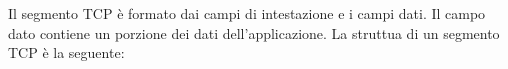 \documentclass{book}
\begin{document}
Il segmento TCP {\`e} formato dai campi di intestazione e i campi dati. Il
campo dato contiene un porzione dei dati dell'applicazione. La struttua di un
segmento TCP {\`e} la seguente:
{}
\end{document}
